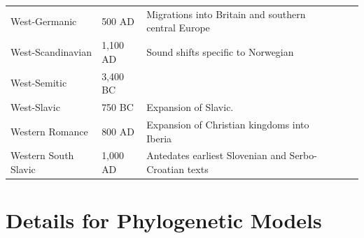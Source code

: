 \documentclass[11pt,a4paper]{article}
\begin{document}
\begin{longtable}{llp{10cm}lll}
West-Germanic & 500 AD & Migrations into Britain and southern central Europe\\
West-Scandinavian & 1,100 AD & Sound shifts specific to Norwegian\\
West-Semitic & 3,400 BC & \citep{kitchen2009bayesian}  \\
West-Slavic & 750 BC & Expansion of Slavic. \\ %
Western Romance & 800 AD & Expansion of Christian kingdoms into Iberia \\
Western South Slavic & 1,000 AD & Antedates earliest Slovenian and Serbo-Croatian texts\\
\end{longtable}





\section{Details for Phylogenetic Models}








\end{document}
